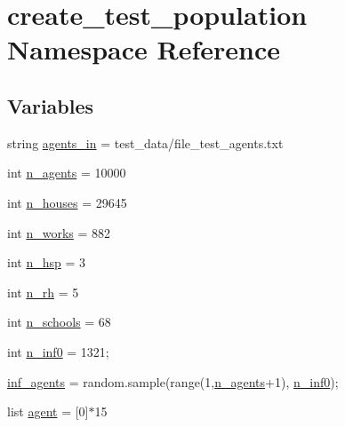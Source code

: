 \hypertarget{namespacecreate__test__population}{}\section{create\+\_\+test\+\_\+population Namespace Reference}
\label{namespacecreate__test__population}
\subsection*{Variables}
\begin{DoxyCompactItemize}
\item 
string \hyperlink{namespacecreate__test__population_ad38d49dc9ca23d3d36e75fa605f2512d}{agents\+\_\+in} = \textquotesingle{}test\+\_\+data/file\+\_\+test\+\_\+agents.\+txt\textquotesingle{}
\item 
int \hyperlink{namespacecreate__test__population_af5d9fb4a9ec85f5c2845626abb4726a2}{n\+\_\+agents} = 10000
\item 
int \hyperlink{namespacecreate__test__population_a89df5e4b8f24cba6e19d365eba9353ea}{n\+\_\+houses} = 29645
\item 
int \hyperlink{namespacecreate__test__population_a305d4e7a9b2b0940d1a4bc6c8524cb09}{n\+\_\+works} = 882
\item 
int \hyperlink{namespacecreate__test__population_a4e64cba086c29c404e3869ddd435fb70}{n\+\_\+hsp} = 3
\item 
int \hyperlink{namespacecreate__test__population_a5282307cd30f0e183d57c5d25e40cded}{n\+\_\+rh} = 5
\item 
int \hyperlink{namespacecreate__test__population_a7bdfa6978eaf883141b8c1326af9b1d3}{n\+\_\+schools} = 68
\item 
int \hyperlink{namespacecreate__test__population_afde859fed178859796d80019b14ba289}{n\+\_\+inf0} = 1321;
\item 
\hyperlink{namespacecreate__test__population_aa8a1d3292dd6b8f05116677629d1da02}{inf\+\_\+agents} = random.\+sample(range(1,\hyperlink{namespacecreate__test__population_af5d9fb4a9ec85f5c2845626abb4726a2}{n\+\_\+agents}+1), \hyperlink{namespacecreate__test__population_afde859fed178859796d80019b14ba289}{n\+\_\+inf0});
\item 
list \hyperlink{namespacecreate__test__population_aa41e7da2f9bd432e657e942b4ac731af}{agent} = \mbox{[}\textquotesingle{}0\textquotesingle{}\mbox{]}$\ast$15
\end{DoxyCompactItemize}


